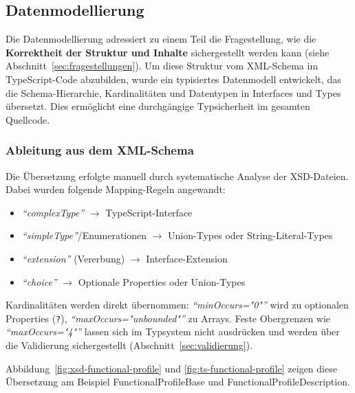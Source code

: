 \documentclass[a4paper,12pt]{article}
\newcommand{\xmlelement}[1]{\textit{``#1''}}
\newcommand{\xmlattr}[1]{\textit{``#1''}}
\newcommand{\code}[1]{\texttt{#1}}
\begin{document}
\subsection{Datenmodellierung}
\label{sec:datenmodellierung}

Die Datenmodellierung adressiert zu einem Teil die Fragestellung, wie die \textbf{Korrektheit der Struktur und Inhalte} 
sichergestellt werden kann (siehe Abschnitt~\ref{sec:fragestellungen}). Um diese Struktur vom XML-Schema im 
TypeScript-Code abzubilden, wurde ein typisiertes Datenmodell entwickelt, das die Schema-Hierarchie, Kardinalitäten und 
Datentypen in Interfaces und Types übersetzt. Dies ermöglicht eine durchgängige Typsicherheit im gesamten Quellcode.

\subsubsection{Ableitung aus dem XML-Schema}

Die Übersetzung erfolgte manuell durch systematische Analyse der XSD-Dateien. Dabei wurden folgende 
Mapping-Regeln angewandt:
\begin{itemize}[noitemsep,topsep=0pt]
    \item \xmlelement{complexType} $\rightarrow$ TypeScript-Interface
    \item \xmlelement{simpleType}/Enumerationen $\rightarrow$ Union-Types oder String-Literal-Types
    \item \xmlelement{extension} (Vererbung) $\rightarrow$ Interface-Extension
    \item \xmlelement{choice} $\rightarrow$ Optionale Properties oder Union-Types
\end{itemize}

\noindent Kardinalitäten werden direkt übernommen: \xmlattr{minOccurs="0"} wird zu optionalen Properties (\code{?}), 
\xmlattr{maxOccurs="unbounded"} zu Arrays. Feste Obergrenzen wie \xmlattr{maxOccurs="4"} lassen sich im 
Typsystem nicht ausdrücken und werden über die Validierung sichergestellt (Abschnitt~\ref{sec:validierung}).

\noindent Abbildung~\ref{fig:xsd-functional-profile} und \ref{fig:ts-functional-profile} zeigen diese Übersetzung 
am Beispiel FunctionalProfileBase und FunctionalProfileDescription.
\end{document}
